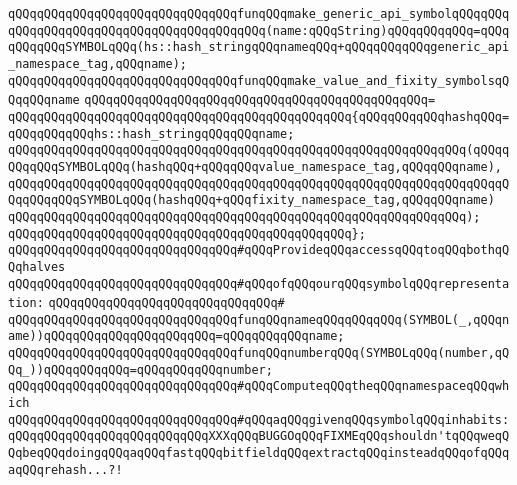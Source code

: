 \verb|qQQqqQQqqQQqqQQqqQQqqQQqqQQqqQQqfunqQQqmake_generic_api_symbolqQQqqQQqqQQqqQQqqQQqqQQqqQQqqQQqqQQqqQQqqQQq(name:qQQqString)qQQqqQQqqQQq=qQQqqQQqqQQqSYMBOLqQQq(hs::hash_stringqQQqnameqQQq+qQQqqQQqqQQqgeneric_api_namespace_tag,qQQqname);|\newline
\newline
\verb|qQQqqQQqqQQqqQQqqQQqqQQqqQQqqQQqfunqQQqmake_value_and_fixity_symbolsqQQqqQQqname|\newline
\verb|qQQqqQQqqQQqqQQqqQQqqQQqqQQqqQQqqQQqqQQqqQQqqQQq=|\newline
\verb|qQQqqQQqqQQqqQQqqQQqqQQqqQQqqQQqqQQqqQQqqQQqqQQq{qQQqqQQqqQQqhashqQQq=qQQqqQQqqQQqhs::hash_stringqQQqqQQqname;|\newline
\newline
\verb|qQQqqQQqqQQqqQQqqQQqqQQqqQQqqQQqqQQqqQQqqQQqqQQqqQQqqQQqqQQqqQQq(qQQqqQQqqQQqSYMBOLqQQq(hashqQQq+qQQqqQQqvalue_namespace_tag,qQQqqQQqname),|\newline
\verb|qQQqqQQqqQQqqQQqqQQqqQQqqQQqqQQqqQQqqQQqqQQqqQQqqQQqqQQqqQQqqQQqqQQqqQQqqQQqqQQqSYMBOLqQQq(hashqQQq+qQQqfixity_namespace_tag,qQQqqQQqname)|\newline
\verb|qQQqqQQqqQQqqQQqqQQqqQQqqQQqqQQqqQQqqQQqqQQqqQQqqQQqqQQqqQQqqQQq);|\newline
\verb|qQQqqQQqqQQqqQQqqQQqqQQqqQQqqQQqqQQqqQQqqQQqqQQq};|\newline
\newline
\newline
\newline
\verb|qQQqqQQqqQQqqQQqqQQqqQQqqQQqqQQq#qQQqProvideqQQqaccessqQQqtoqQQqbothqQQqhalves|\newline
\verb|qQQqqQQqqQQqqQQqqQQqqQQqqQQqqQQq#qQQqofqQQqourqQQqsymbolqQQqrepresentation:|\newline
\verb|qQQqqQQqqQQqqQQqqQQqqQQqqQQqqQQq#|\newline
\verb|qQQqqQQqqQQqqQQqqQQqqQQqqQQqqQQqfunqQQqnameqQQqqQQqqQQq(SYMBOL(_,qQQqname))qQQqqQQqqQQqqQQqqQQqqQQq=qQQqqQQqqQQqname;|\newline
\verb|qQQqqQQqqQQqqQQqqQQqqQQqqQQqqQQqfunqQQqnumberqQQq(SYMBOLqQQq(number,qQQq_))qQQqqQQqqQQq=qQQqqQQqqQQqnumber;|\newline
\newline
\newline
\newline
\verb|qQQqqQQqqQQqqQQqqQQqqQQqqQQqqQQq#qQQqComputeqQQqtheqQQqnamespaceqQQqwhich|\newline
\verb|qQQqqQQqqQQqqQQqqQQqqQQqqQQqqQQq#qQQqaqQQqgivenqQQqsymbolqQQqinhabits:qQQqqQQqqQQqqQQqqQQqqQQqqQQqXXXqQQqBUGGOqQQqFIXMEqQQqshouldn'tqQQqweqQQqbeqQQqdoingqQQqaqQQqfastqQQqbitfieldqQQqextractqQQqinsteadqQQqofqQQqaqQQqrehash...?!|\newline
